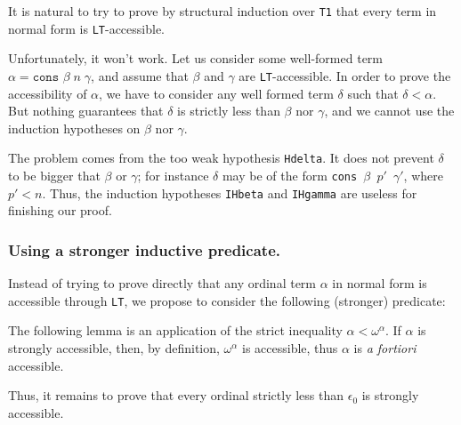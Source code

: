 It is natural to try to prove by structural induction over \texttt{T1} 
that every term in normal form is \texttt{LT}-accessible.

Unfortunately, it won't work. Let us consider some well-formed term
 $\alpha=\texttt{cons $\beta\;n\;\gamma$}$, and assume that \(\beta\) and \(\gamma\) are \texttt{LT}-accessible.
In order to prove the accessibility of $\alpha$, we have to consider
any well formed term \(\delta\) such that \(\delta<\alpha\). 
But nothing guarantees that \(\delta\)  is strictly  less than \(\beta\) nor \(\gamma\), and we cannot use the induction hypotheses on   \(\beta\) nor \(\gamma\).




The problem comes from the too weak hypothesis \texttt{Hdelta}. It does not prevent  \(\delta\) to be bigger that \(\beta\) or
\(\gamma\);
for instance \(\delta\) may be of the form
\texttt{cons $\beta$ $p'$  $\gamma'$},
where    \(p' < n\).
Thus, the induction hypotheses \texttt{IHbeta} and \texttt{IHgamma}  are useless for finishing our proof.



\subsubsection{Using a stronger inductive predicate.}
\label{sec:orgheadline78}
\label{sec:strongly-accessible}

  Instead of trying to prove directly that any ordinal term \(\alpha\) in normal form is accessible
through \texttt{LT}, we propose to consider the following (stronger) predicate:




The following lemma is an application of the strict inequality 
$\alpha < \omega ^\alpha$. If $\alpha$ is strongly accessible, then, by definition,
$\omega^\alpha$ is accessible, thus $\alpha$ is \emph{a fortiori} accessible.




Thus, it remains to prove that every ordinal strictly less than $\epsilon_0$
is strongly accessible.


